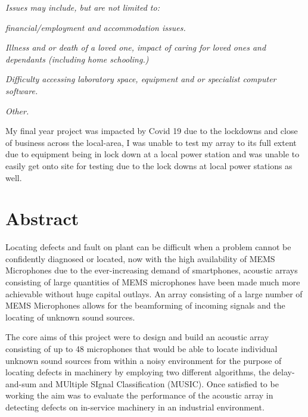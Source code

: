 \documentclass{UoNMCHA}
\numberwithin{equation}{section}
\begin{document}
    \emph{Issues may include, but are not limited to:}
    
    \emph{financial/employment and accommodation issues.}
    
    \emph{Illness and or death of a loved one, impact of caring for loved ones and dependants (including home schooling.)}
    
    \emph{Difficulty accessing laboratory space, equipment and or specialist computer software.}
    
    \emph{Other.}

    My final year project was impacted by Covid 19 due to the lockdowns and close of business across the local-area, I was unable to test my array to its full extent due to equipment being in lock down at a local power station and was unable to easily get onto site for testing due to the lock downs at local power stations as well.
\newpage
\vspace{-5mm}
\section*{Abstract}
\vspace{-3mm}
    
    Locating defects and fault on plant can be difficult when a problem cannot be confidently diagnosed or located,
    now with the high availability of MEMS Microphones due to the ever-increasing demand of smartphones, acoustic arrays consisting of large quantities of MEMS microphones have been made much more achievable without huge capital outlays. An array consisting of a large number of MEMS Microphones allows for the beamforming of incoming signals and the locating of unknown sound sources. 
    
    The core aims of this project were to design and build an acoustic array consisting of up to 48 microphones that would be able to locate individual unknown sound sources from within a noisy environment for the purpose of locating defects in machinery by employing two different algorithms, the delay-and-sum and MUltiple SIgnal Classification (MUSIC). Once satisfied to be working the aim was to evaluate the performance of the acoustic array in detecting defects on in-service machinery in an industrial environment.
    
\end{document}
